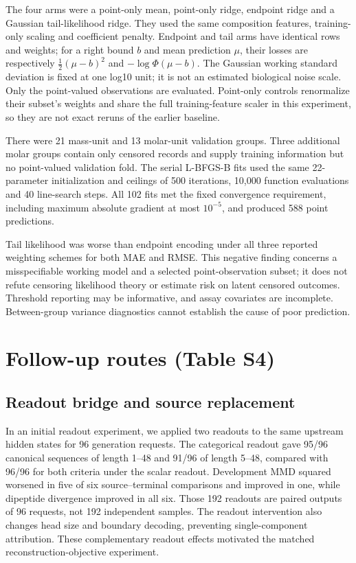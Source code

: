 \documentclass[11pt,a4paper]{article}
\begin{document}
The four arms were a point-only mean, point-only ridge, endpoint ridge and a Gaussian tail-likelihood ridge. They used the same composition features, training-only scaling and coefficient penalty. Endpoint and tail arms have identical rows and weights; for a right bound $b$ and mean prediction $\mu$, their losses are respectively $\tfrac12(\mu-b)^2$ and $-\log\Phi(\mu-b)$. The Gaussian working standard deviation is fixed at one log10 unit; it is not an estimated biological noise scale. Only the point-valued observations are evaluated. Point-only controls renormalize their subset's weights and share the full training-feature scaler in this experiment, so they are not exact reruns of the earlier baseline.

There were 21 mass-unit and 13 molar-unit validation groups. Three additional molar groups contain only censored records and supply training information but no point-valued validation fold. The serial L-BFGS-B fits used the same 22-parameter initialization and ceilings of 500 iterations, 10,000 function evaluations and 40 line-search steps. All 102 fits met the fixed convergence requirement, including maximum absolute gradient at most $10^{-5}$, and produced 588 point predictions.

Tail likelihood was worse than endpoint encoding under all three reported weighting schemes for both MAE and RMSE. This negative finding concerns a misspecifiable working model and a selected point-observation subset; it does not refute censoring likelihood theory or estimate risk on latent censored outcomes. Threshold reporting may be informative, and assay covariates are incomplete. Between-group variance diagnostics cannot establish the cause of poor prediction.


\section{Follow-up routes (Table S4)}
\subsection*{Readout bridge and source replacement}
In an initial readout experiment, we applied two readouts to the same upstream hidden states for 96 generation requests. The categorical readout gave 95/96 canonical sequences of length 1--48 and 91/96 of length 5--48, compared with 96/96 for both criteria under the scalar readout. Development MMD squared worsened in five of six source--terminal comparisons and improved in one, while dipeptide divergence improved in all six. Those 192 readouts are paired outputs of 96 requests, not 192 independent samples. The readout intervention also changes head size and boundary decoding, preventing single-component attribution. These complementary readout effects motivated the matched reconstruction-objective experiment.
\end{document}
